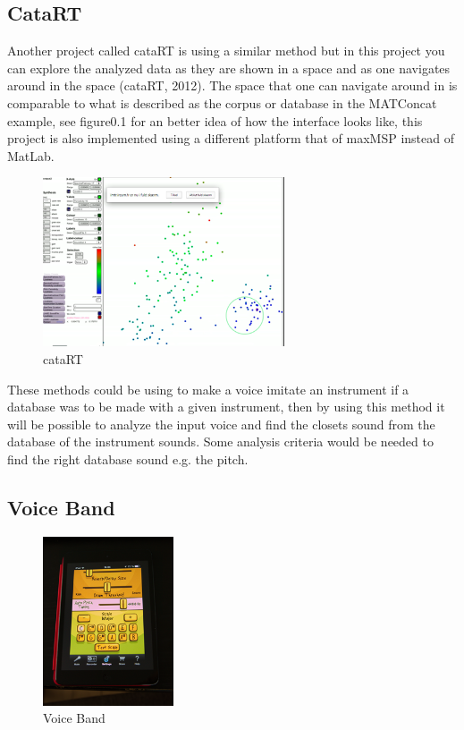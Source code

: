 \subsection{ CataRT }
Another project called cataRT is using a similar method but in this project you can explore the analyzed data as they are shown in a space and as one navigates around in the space (cataRT, 2012). The space that one can navigate around in is comparable to what is described as the corpus or database in the MATConcat example, see figure0.1 for an better idea of how the interface looks like, this project is also implemented using a different platform that of maxMSP instead of MatLab.
\begin{figure}[h]
	\begin{center}
		\includegraphics[height=5cm]{fig/cataRT.png}
		\caption{cataRT}
		\label{cataRT picture form video of cataRT showing the interface.}
	\end{center}
\end{figure} 
These methods could be using to make a voice imitate an instrument if a database was to be made with a given instrument, then by using this method it will be possible to analyze the input voice and find the closets sound from the database of the instrument sounds. Some analysis criteria would be needed to find the right database sound e.g. the pitch. 

\subsection{ Voice Band }
\begin{figure}[h]
	\begin{center}
		\includegraphics[height=5cm]{fig/voiceband.png}
		\caption{Voice Band}
		\label{VoiceBand}
	\end{center}
\end{figure}

